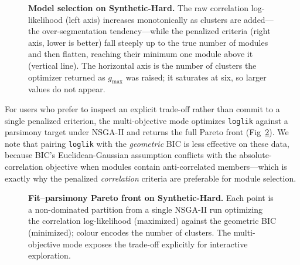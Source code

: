 \begin{figure}[!h]
\caption{\textbf{Model selection on Synthetic-Hard.}
The raw correlation log-likelihood (left axis) increases monotonically as
clusters are added---the over-segmentation tendency---while the penalized
criteria (right axis, lower is better) fall steeply up to the true number of modules and then flatten, reaching their minimum one module above it (vertical line). The horizontal axis is the number of clusters the optimizer returned as $g_{\max}$ was raised; it saturates at six, so larger values do not appear.}
\label{fig:modelsel}
\end{figure}

For users who prefer to inspect an explicit trade-off rather than commit to a
single penalized criterion, the multi-objective mode optimizes \texttt{loglik}
against a parsimony target under NSGA-II and returns the full Pareto front
(Fig~\ref{fig:pareto}). We note that pairing \texttt{loglik} with the
\emph{geometric} BIC is less effective on these data, because BIC's
Euclidean-Gaussian assumption conflicts with the absolute-correlation objective
when modules contain anti-correlated members---which is exactly why the penalized
\emph{correlation} criteria are preferable for module selection.

\begin{figure}[!h]
\caption{\textbf{Fit--parsimony Pareto front on Synthetic-Hard.}
Each point is a non-dominated partition from a single NSGA-II run optimizing the
correlation log-likelihood (maximized) against the geometric BIC (minimized);
colour encodes the number of clusters. The multi-objective mode exposes the
trade-off explicitly for interactive exploration.}
\label{fig:pareto}
\end{figure}

\begin{table}[!ht]
\centering
\caption{\textbf{Model selection with $k$ unknown} (mean $\pm$ SD over \NSeeds{} datasets, five-module design at $\sigma=1.5$, true $k=5$). Every method runs free: no ground-truth $k$ and no oracle tuning. The \tool{} and hierarchical rows use the same penalized correlation criterion and differ only in optimizer.}
\label{tab:modelsel}
\end{table}

